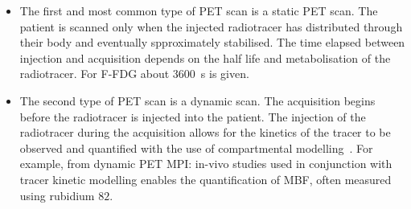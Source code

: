                 \begin{itemize}
                    \item The first and most common type of \gls{PET} scan is a static \gls{PET} scan. The patient is scanned only when the injected radiotracer has distributed through their body and eventually spproximately stabilised. %
                    The time elapsed between injection and acquisition depends on the half life and metabolisation of the radiotracer. For \gls{F-FDG} about \SI{3600}{\second} is given.
                    
                    \item The second type of \gls{PET} scan is a dynamic scan. The acquisition begins before the radiotracer is injected into the patient. The injection of the radiotracer during the acquisition allows for the kinetics of the tracer to be observed and quantified with the use of compartmental modelling~. For example, from dynamic \gls{PET} \gls{MPI}: %
                    in-vivo studies used in conjunction with tracer kinetic modelling enables the quantification of \gls{MBF}, often measured using rubidium $82$. %
                \end{itemize}
            
